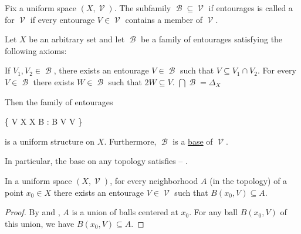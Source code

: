 \begin{definition}\label{def:uniform_space_base}
  Fix a uniform space \( (X, \mscrV) \). The subfamily \( \mscrB \subseteq \mscrV \) if entourages is called a  for \( \mscrV \) if every entourage \( V \in \mscrV \) contains a member of \( \mscrV \).
\end{definition}

\begin{definition}\label{thm:uniform_space_base_axioms}\mcite\cite[prop. 8.1.14]{Engelking1989}
  Let \( X \) be an arbitrary set and let \( \mscrB \) be a family of entourages satisfying the following axioms:
  \begin{defenum}
     If \( V_1, V_2 \in \mscrB \), there exists an entourage \( V \in \mscrB \) such that \( V \subseteq V_1 \cap V_2 \).
     For every \( V \in \mscrB \) there exists \( W \in \mscrB \) such that \( 2W \subseteq V \).
     \( \bigcap \mscrB = \Delta_X \)
  \end{defenum}

  Then the family of entourages
  \begin{balign}\label{thm:uniform_space_base_axioms/uniformity}
    \mscrV \coloneqq \left\{ V \subseteq X \times X \colon \exists B \in \mscrB: B \in V  V  \right\}
  \end{balign}
  is a uniform structure on \( X \). Furthermore, \( \mscrB \) is a \hyperref[def:uniform_space_base]{base} of \( \mscrV \).

  In particular, the base on any topology satisfies  -- .
\end{definition}

\begin{lemma}\label{thm:uniform_space_neighborhood_contains_ball}
  In a uniform space \( (X, \mscrV) \), for every neighborhood \( A \) (in the topology) of a point \( x_0 \in X \) there exists an entourage \( V \in \mscrV \) such that \( B(x_0, V) \subseteq A \).
\end{lemma}
\begin{proof}
  By  and , \( A \) is a union of balls centered at \( x_0 \). For any ball \( B(x_0, V) \) of this union, we have \( B(x_0, V) \subseteq A \).
\end{proof}


